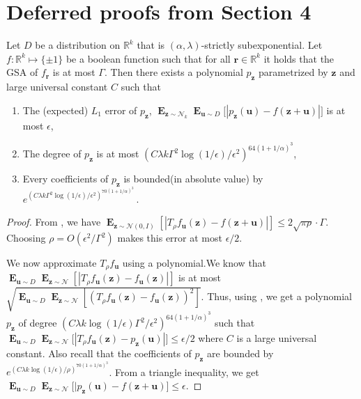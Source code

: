 \documentclass{theoretics}
\renewcommand\vec[1]{\mathbf{#1}}
\DeclareMathOperator*{\E}{\mathbf{E}}
\newcommand{\R}{\mathbb{R}}
\newcommand{\1}{\Ind}
\newcommand{\vu}{\vec u}
\newcommand{\z}{\vec z}
\newcommand{\Gauss}{\mathcal{N}}
\begin{document}
\section{Deferred proofs from Section 4}
\begin{lemma}
    \label{lem:poly_approx_boolean_subexp}
    Let $D$ be a distribution on $\R^k$ that is $(\alpha,\lambda)$-strictly subexponential. Let $f:\R^k \mapsto \{\pm 1\}$ be a boolean function such that
    for all $\vec r \in \R^k$ it holds that 
    the GSA of $f_{\vec r}$  is at most $\Gamma$. Then there exists a polynomial $p_{\z}$ parametrized by $\z$ and large universal constant $C$ such that 
    \begin{enumerate}
        \item The (expected) $L_1$ error of $p_{\z}$, $\E_{\z\sim \Gauss_k}\E_{\vu\sim D}\bigl[|p_{\z}(\vu)-f(\z+\vu)|\bigr]$ is at most $\epsilon$,
        \item The degree of $p_{\z}$ is at most $\left(C\lambda k\Gamma^2\log (1/\epsilon)/\epsilon^2\right)^{64(1+1/\alpha)^3} $,
        \item Every coefficients of $p_{\z}$ is bounded(in absolute value) by $e^{\left(C\lambda k\Gamma^2\log (1/\epsilon)/\epsilon^2\right)^{70(1+1/\alpha)^3}}\,.$
    \end{enumerate}
\end{lemma}

\begin{proof}
   From , we have 
$\E_{\z\sim\mathcal{N}(0,I)}\left[\left|T_\rho f_{\vu}(\z)-f(\z+\vu)\right|\right]\leq  2\sqrt{\pi\rho}\cdot \Gamma$. Choosing $\rho=O(\epsilon^2/\Gamma^2)$ makes this error at most $\epsilon/2$. 

We now approximate $T_{\rho}f_{\vu}$ using a polynomial.We know that 
    $\E_{\vu\sim D}\E_{\z\sim\Gauss}\left[\left|T_\rho f_{\vu}(\z)-f_{\vu}(\z)\right|\right]$ is at most $\sqrt{\E_{\vu\sim D}\E_{\z\sim\Gauss}\left[\left(T_\rho f_{\vu}(\z)-f_{\vu}(\z)\right)^2\right]}$. Thus, using  , we get a polynomial $p_{\z}$ of degree $\left(C\lambda k\log (1/\epsilon)\Gamma^2/\epsilon^2\right)^{64(1+1/\alpha)^3}$ such that
$\E_{\vu\sim D}\E_{\z\sim \Gauss}\bigl[|T_{\rho}f_{\vu}(\z)-p_{\z}(\vu)|\bigr]\leq \epsilon/2$ where $C$ is a large universal constant. Also recall that the coefficients of $p_{\z}$ are bounded by $e^{\left(C\lambda k\log (1/\epsilon)/\rho\right)^{70(1+1/\alpha)^3}}$. From a triangle inequality, we get 
$\E_{\vu\sim D}\E_{\z\sim \Gauss}\bigl[|p_{\z}(\vu)-f(\z+\vu)\bigr]\leq \epsilon$.
\end{proof}
\end{document}
